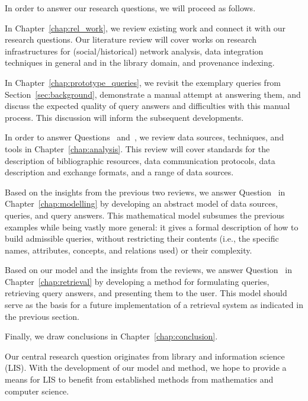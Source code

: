 In order to answer our research questions, we will proceed as follows.

In Chapter~\ref{chap:rel_work}, we review existing work 
and connect it with our research questions.
Our literature review will cover works on research infrastructures
for (social/historical) network analysis,
data integration techniques in general and in the library domain,
and provenance indexing.

In Chapter~\ref{chap:prototype_queries}, we revisit
the exemplary queries from Section~\ref{sec:background},
demonstrate a manual attempt at answering them,
and discuss the expected quality of query answers and difficulties with this manual process.
This discussion will inform the subsequent developments.

In order to answer Questions~ and~, we review
data sources, techniques, and tools in Chapter~\ref{chap:analysis}.
This review will cover standards for the description of bibliographic resources,
data communication protocols, data description and exchange formats,
and a range of data sources.

Based on the insights from the previous two reviews,
we answer Question~ in Chapter~\ref{chap:modelling} by
developing an abstract model of
data sources, queries, and query answers.
This mathematical model subsumes the previous examples
while being vastly more general: it gives a formal description of how to
build admissible queries, without restricting their contents
(i.e., the specific names, attributes, concepts, and relations used)
or their complexity. 

Based on our model and the insights from the reviews,
we answer Question~ in Chapter~\ref{chap:retrieval} by
developing a method for formulating queries, retrieving query answers,
and presenting them to the user.
This model should serve as the basis for a future implementation of a retrieval system
as indicated in the previous section.

Finally, we draw conclusions in Chapter~\ref{chap:conclusion}.

Our central research question originates from library and information science (LIS).
With the development of our model and method,
we hope to provide a means for LIS to benefit 
from established methods from mathematics and computer science.
